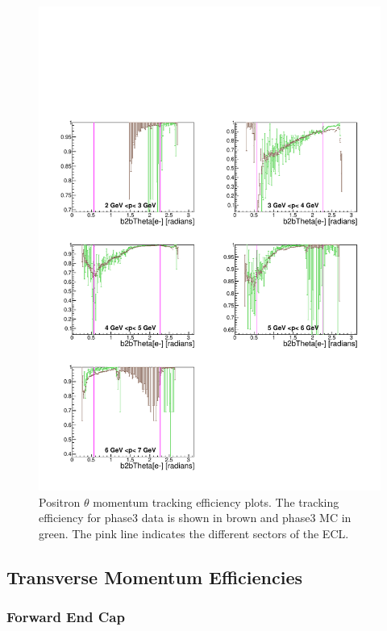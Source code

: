 \documentclass[a4paper,11pt,twosided,final,german,openbib,pdftex,listof=totoc,bibliography=totoc]{scrbook}
\begin{document}
\begin{figure}[!htbp]
	\centering
	\includegraphics[width=\textwidth]{Plots/master3/xPMThetaepP3}
	\caption[Momentum $\theta$ Positron Efficiency Phase3]{Positron $\theta$ momentum tracking efficiency plots. The tracking efficiency for phase3 data is shown in brown and phase3 MC in green. The pink line indicates the different sectors of the ECL.}
	\label{plt:xPMThetaep3}
\end{figure}




\newpage
\subsection{Transverse Momentum Efficiencies}





\subsubsection{Forward End Cap}
\end{document}
